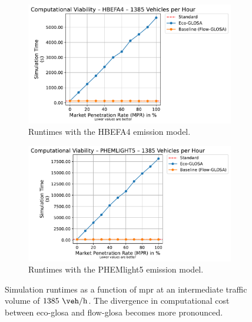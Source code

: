 \begin{figure}[htbp]
  \centering
  \begin{subfigure}[b]{0.98\textwidth}
    \includegraphics[width=\textwidth]{data/img/ComputationalViability/ComputationalViability_HBEFA4_Cars1385.pdf}
    \caption{Runtimes with the HBEFA4 emission model.}
    \label{fig:Comp_1385_HBEFA4}
  \end{subfigure}
  \begin{subfigure}[b]{0.98\textwidth}
    \includegraphics[width=\textwidth]{data/img/ComputationalViability/ComputationalViability_PHEMLIGHT5_Cars1385.pdf}
    \caption{Runtimes with the PHEMlight5 emission model.}
    \label{fig:Comp_1385_PHEM}
  \end{subfigure}
  \caption[Computational Cost at Intermediate Traffic Volume]{Simulation runtimes as a function of \ac{mpr} at an intermediate traffic volume of $1385~\unit{\veh\per\hour}$. The divergence in computational cost between \ac{eco-glosa} and \ac{flow-glosa} becomes more pronounced.}
  \label{fig:Comp_1385}
\end{figure}

